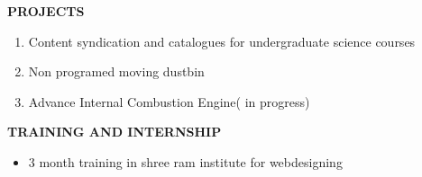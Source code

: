\documentclass{article}
\begin{document}
\begin{flushleft}
	\vspace{0.30in}
	\textbf{PROJECTS}
	\begin{enumerate}
		\item Content syndication and catalogues for undergraduate science courses\\
		\item Non programed moving dustbin\\
		\item Advance Internal Combustion Engine( in progress)\\
		
	\end{enumerate}
\end{flushleft}

\begin{flushleft}
	\vspace{0.1in}
	\textbf{TRAINING AND INTERNSHIP}
	\begin{itemize}
		\item 3 month training in shree ram institute for webdesigning
	\end{itemize}
\end{flushleft}
\end{document}

